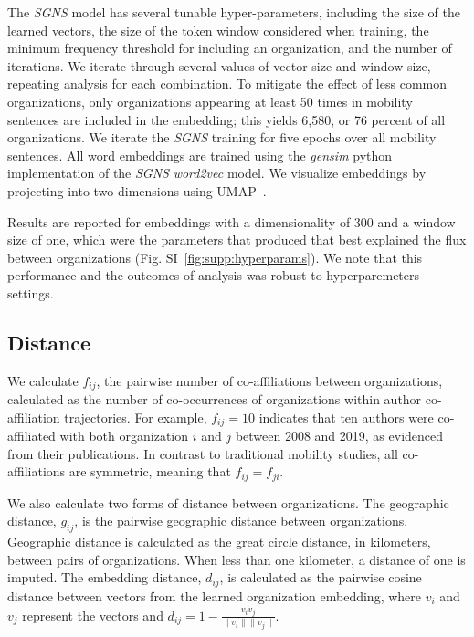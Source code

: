 \documentclass[12pt]{article} %
\def\SGNS{\textit{SGNS}}
\begin{document}
The \SGNS{} model has several tunable hyper-parameters, including the size of the learned vectors, the size of the token window  considered when training, the minimum frequency threshold for including an organization, and the number of iterations.
We iterate through several values of vector size and window size, repeating analysis for each combination. 
To mitigate the effect of less common organizations, only organizations appearing at least 50 times in mobility sentences are included in the embedding;
this yields 6,580, or 76 percent of all organizations.
We iterate the \SGNS{} training for five epochs over all mobility sentences. 
All word embeddings are trained using the \textit{gensim} python implementation of the \SGNS{} \textit{word2vec} model. 
We visualize embeddings by projecting into two dimensions using UMAP~\autocite{mcinnes2018umap}.


Results are reported for embeddings with a dimensionality of 300 and a window size of one, which were the parameters that produced  that best explained the flux between organizations (Fig. SI~\ref{fig:supp:hyperparams}). 
We note that this performance and the outcomes of analysis was robust to hyperparemeters settings. 


%
%
\subsection{Distance}
We calculate $f_{ij}$, the pairwise number of co-affiliations between organizations, calculated as the number of co-occurrences of organizations within author co-affiliation trajectories. 
For example, $f_{ij} = 10$ indicates that ten authors were co-affiliated with both organization $i$ and $j$ between 2008 and 2019, as evidenced from their publications. 
In contrast to traditional mobility studies, all co-affiliations are symmetric, meaning that $f_{ij} = f_{ji}$. 

We also calculate two forms of distance between organizations. 
The geographic distance, $g_{ij}$, is the pairwise geographic distance between organizations.
Geographic distance is calculated as the great circle distance, in kilometers, between pairs of organizations. 
When less than one kilometer, a distance of one is imputed. 
The embedding distance, $d_{ij}$, is calculated as the pairwise cosine distance between vectors from the learned organization embedding, where $v_{i}$ and $v_{j}$ represent the vectors and $d_{ij} = 1 - \frac{v_{i} \dot v_{j}}{\lVert v_{i} \rVert \lVert v_{j} \rVert}$.
\end{document}
